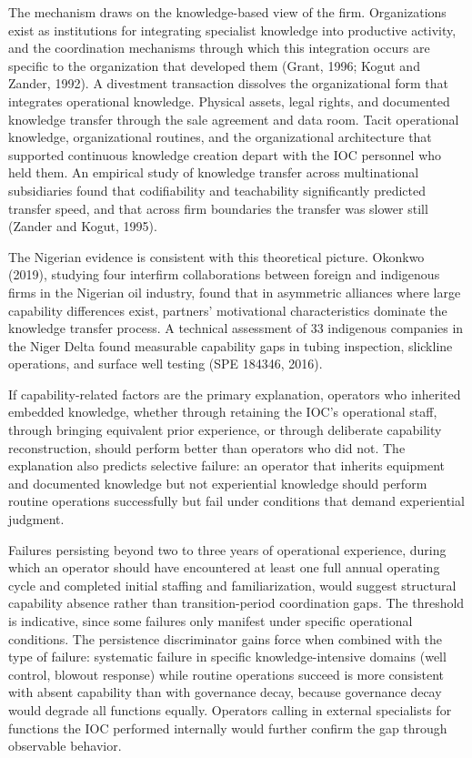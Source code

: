 The mechanism draws on the knowledge-based view of the firm.
Organizations exist as institutions for integrating specialist knowledge
into productive activity, and the coordination mechanisms through which
this integration occurs are specific to the organization that developed
them (Grant, 1996; Kogut and Zander, 1992). A divestment transaction
dissolves the organizational form that integrates operational knowledge.
Physical assets, legal rights, and documented knowledge transfer through
the sale agreement and data room. Tacit operational knowledge,
organizational routines, and the organizational architecture that
supported continuous knowledge creation depart with the IOC personnel
who held them. An empirical study of knowledge transfer across
multinational subsidiaries found that codifiability and teachability
significantly predicted transfer speed, and that across firm boundaries
the transfer was slower still (Zander and Kogut, 1995).

The Nigerian evidence is consistent with this theoretical picture.
Okonkwo (2019), studying four interfirm collaborations between foreign
and indigenous firms in the Nigerian oil industry, found that in
asymmetric alliances where large capability differences exist, partners'
motivational characteristics dominate the knowledge transfer process. A
technical assessment of 33 indigenous companies in the Niger Delta found
measurable capability gaps in tubing inspection, slickline operations,
and surface well testing (SPE 184346, 2016).

If capability-related factors are the primary explanation, operators who
inherited embedded knowledge, whether through retaining the IOC's
operational staff, through bringing equivalent prior experience, or
through deliberate capability reconstruction, should perform better than
operators who did not. The explanation also predicts selective failure:
an operator that inherits equipment and documented knowledge but not
experiential knowledge should perform routine operations successfully
but fail under conditions that demand experiential judgment.

Failures persisting beyond two to three years of operational experience,
during which an operator should have encountered at least one full
annual operating cycle and completed initial staffing and
familiarization, would suggest structural capability absence rather than
transition-period coordination gaps. The threshold is indicative, since
some failures only manifest under specific operational conditions. The
persistence discriminator gains force when combined with the type of
failure: systematic failure in specific knowledge-intensive domains
(well control, blowout response) while routine operations succeed is
more consistent with absent capability than with governance decay,
because governance decay would degrade all functions equally. Operators
calling in external specialists for functions the IOC performed
internally would further confirm the gap through observable behavior.

